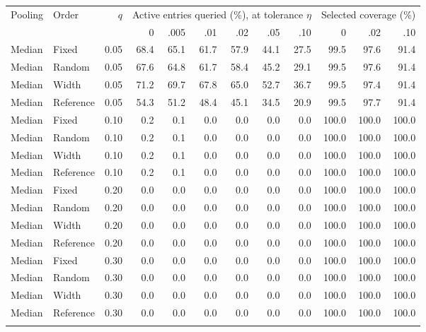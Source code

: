 \begin{table}[t]
\centering\small\setlength{\tabcolsep}{3pt}
\begin{tabular}{llrrrrrrrrrr}
\toprule
Pooling & Order & $q$ & \multicolumn{6}{c}{Active entries queried (\%), at tolerance $\eta$} & \multicolumn{3}{c}{Selected coverage (\%)} \\
\cmidrule(lr){4-9}\cmidrule(lr){10-12}
 & & & 0 & .005 & .01 & .02 & .05 & .10 & 0 & .02 & .10 \\
\midrule
Median & Fixed & 0.05 & 68.4 & 65.1 & 61.7 & 57.9 & 44.1 & 27.5 & 99.5 & 97.6 & 91.4 \\
Median & Random & 0.05 & 67.6 & 64.8 & 61.7 & 58.4 & 45.2 & 29.1 & 99.5 & 97.6 & 91.4 \\
Median & Width & 0.05 & 71.2 & 69.7 & 67.8 & 65.0 & 52.7 & 36.7 & 99.5 & 97.4 & 91.4 \\
Median & Reference & 0.05 & 54.3 & 51.2 & 48.4 & 45.1 & 34.5 & 20.9 & 99.5 & 97.7 & 91.4 \\
\addlinespace
Median & Fixed & 0.10 & 0.2 & 0.1 & 0.0 & 0.0 & 0.0 & 0.0 & 100.0 & 100.0 & 100.0 \\
Median & Random & 0.10 & 0.2 & 0.1 & 0.0 & 0.0 & 0.0 & 0.0 & 100.0 & 100.0 & 100.0 \\
Median & Width & 0.10 & 0.2 & 0.1 & 0.0 & 0.0 & 0.0 & 0.0 & 100.0 & 100.0 & 100.0 \\
Median & Reference & 0.10 & 0.2 & 0.1 & 0.0 & 0.0 & 0.0 & 0.0 & 100.0 & 100.0 & 100.0 \\
\addlinespace
Median & Fixed & 0.20 & 0.0 & 0.0 & 0.0 & 0.0 & 0.0 & 0.0 & 100.0 & 100.0 & 100.0 \\
Median & Random & 0.20 & 0.0 & 0.0 & 0.0 & 0.0 & 0.0 & 0.0 & 100.0 & 100.0 & 100.0 \\
Median & Width & 0.20 & 0.0 & 0.0 & 0.0 & 0.0 & 0.0 & 0.0 & 100.0 & 100.0 & 100.0 \\
Median & Reference & 0.20 & 0.0 & 0.0 & 0.0 & 0.0 & 0.0 & 0.0 & 100.0 & 100.0 & 100.0 \\
\addlinespace
Median & Fixed & 0.30 & 0.0 & 0.0 & 0.0 & 0.0 & 0.0 & 0.0 & 100.0 & 100.0 & 100.0 \\
Median & Random & 0.30 & 0.0 & 0.0 & 0.0 & 0.0 & 0.0 & 0.0 & 100.0 & 100.0 & 100.0 \\
Median & Width & 0.30 & 0.0 & 0.0 & 0.0 & 0.0 & 0.0 & 0.0 & 100.0 & 100.0 & 100.0 \\
Median & Reference & 0.30 & 0.0 & 0.0 & 0.0 & 0.0 & 0.0 & 0.0 & 100.0 & 100.0 & 100.0 \\
\addlinespace
\midrule

\end{tabular}
\end{table}
